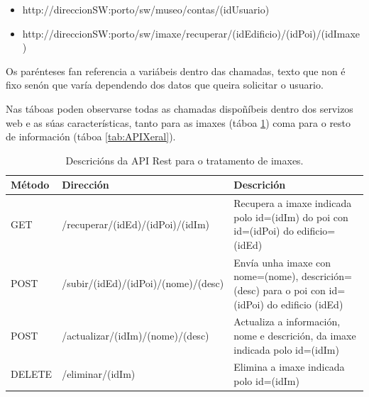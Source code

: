 \begin{itemize}
	\item http://direccionSW:porto/sw/museo/contas/(idUsuario)
	\item http://direccionSW:porto/sw/imaxe/recuperar/(idEdificio)/(idPoi)/(idImaxe)
\end{itemize}

Os parénteses fan referencia a variábeis dentro das chamadas, texto que non é fixo senón que varía dependendo dos datos que queira solicitar o usuario.

Nas táboas poden observarse todas as chamadas dispoñíbeis dentro dos servizos web e as súas características, tanto para as imaxes (táboa \ref{tab:APIImaxes}) coma para o resto de información (táboa \ref{tab:APIXeral}).

\begin{table} [tbh]
	\begin{tabular}{|l|p{6cm}|p{6cm}|}
		\hline 
		\textbf{Método}	& \textbf{Dirección} & \textbf{Descrición} \\ 
		\hline 
		GET & /recuperar/(idEd)/(idPoi)/(idIm) & Recupera a imaxe indicada polo id=(idIm) do poi con id=(idPoi) do edificio=(idEd) \\ 
		\hline 
		POST & /subir/(idEd)/(idPoi)/(nome)/(desc) & Envía unha imaxe con nome=(nome), descrición=(desc) para o poi con id=(idPoi) do edificio (idEd) \\ 
		\hline 
		POST & /actualizar/(idIm)/(nome)/(desc) & Actualiza a información, nome e descrición, da imaxe indicada polo id=(idIm) \\ 
		\hline 
		DELETE & /eliminar/(idIm) & Elimina a imaxe indicada polo id=(idIm) \\ 
		\hline 
	\end{tabular}
	\caption{Descricións da API Rest para o tratamento de imaxes.}
	\label{tab:APIImaxes}
\end{table}

